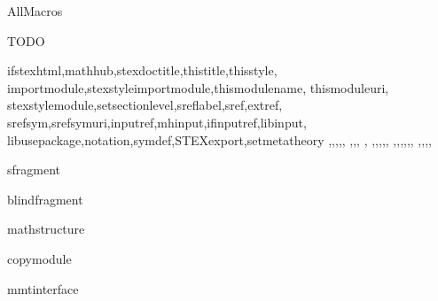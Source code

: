 \documentclass{stex}
\begin{document}
  \begin{smodule}{AllMacros}

  \begin{sfragment}{TODO}

    \begin{sfunction}{
      ifstexhtml,mathhub,stexdoctitle,thistitle,thisstyle,
      importmodule,stexstyleimportmodule,thismodulename,
      thismoduleuri,
      stexstylemodule,setsectionlevel,sreflabel,sref,extref,
      srefsym,srefsymuri,inputref,mhinput,ifinputref,libinput,
      libusepackage,notation,symdef,STEXexport,setmetatheory
    }{\ifstexhtml,\mathhub,\stexdoctitle,\thistitle,\thisstyle,
    \importmodule,\stexstyleimportmodule,\thismodulename,
    \thismoduleuri,
    \stexstylemodule,\setsectionlevel,\sreflabel,\sref,\extref,
    \srefsym,\srefsymuri,,\mhinput,\ifinputref,\libinput,
    \libusepackage,\notation,\symdef,\STEXexport,\setmetatheory
    }
    \end{sfunction}

    \begin{senv}{sfragment}\end{senv}
    \begin{senv}{blindfragment}\end{senv}
    \begin{senv}{mathstructure}\end{senv}
    \begin{senv}{copymodule}\end{senv}
    \begin{senv}{mmtinterface}\end{senv}

  \end{sfragment}
  \end{smodule}
\end{document}
